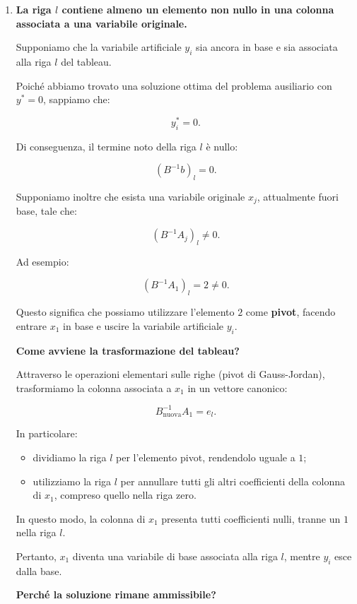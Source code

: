 \begin{enumerate}

    \item \textbf{La riga $l$ contiene almeno un elemento non nullo in una colonna associata a una variabile originale.}

    Supponiamo che la variabile artificiale $y_i$ sia ancora in base e sia associata alla riga $l$ del tableau.

    Poiché abbiamo trovato una soluzione ottima del problema ausiliario con $y^*=0$, sappiamo che:

    \[
    y_i^*=0.
    \]

    Di conseguenza, il termine noto della riga $l$ è nullo:

    \[
    (B^{-1}b)_l=0.
    \]

    Supponiamo inoltre che esista una variabile originale $x_j$, attualmente fuori base, tale che:

    \[
    (B^{-1}A_j)_l\neq 0.
    \]

    Ad esempio:

    \[
    (B^{-1}A_1)_l=2\neq 0.
    \]

    Questo significa che possiamo utilizzare l'elemento $2$ come \textbf{pivot}, facendo entrare $x_1$ in base e uscire la variabile artificiale $y_i$.

    \textbf{Come avviene la trasformazione del tableau?}

    Attraverso le operazioni elementari sulle righe (pivot di Gauss-Jordan), trasformiamo la colonna associata a $x_1$ in un vettore canonico:

    \[
    B_{\mathrm{nuova}}^{-1}A_1=e_l.
    \]

    In particolare:
    \begin{itemize}
        \item dividiamo la riga $l$ per l'elemento pivot, rendendolo uguale a $1$;
        \item utilizziamo la riga $l$ per annullare tutti gli altri coefficienti della colonna di $x_1$, compreso quello nella riga zero.
    \end{itemize}

    In questo modo, la colonna di $x_1$ presenta tutti coefficienti nulli, tranne un $1$ nella riga $l$.

    Pertanto, $x_1$ diventa una variabile di base associata alla riga $l$, mentre $y_i$ esce dalla base.

    \textbf{Perché la soluzione rimane ammissibile?}


\end{enumerate}
